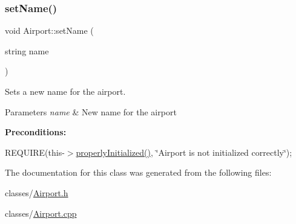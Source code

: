\subsubsection{\texorpdfstring{set\+Name()}{setName()}}
{\footnotesize\ttfamily void Airport\+::set\+Name (\begin{DoxyParamCaption}\item[{string}]{name }\end{DoxyParamCaption})}



Sets a new name for the airport. 


\begin{DoxyParams}{Parameters}
{\em name} & New name for the airport\\
\hline
\end{DoxyParams}
{\bfseries Preconditions\+:}
\begin{DoxyItemize}
\item R\+E\+Q\+U\+I\+RE(this-\/$>$\mbox{\hyperlink{class_airport_aa13e68ac58e8875837fbe888325cfff6}{properly\+Initialized()}}, \char`\"{}\+Airport is not initialized correctly\char`\"{}); 
\end{DoxyItemize}

The documentation for this class was generated from the following files\+:\begin{DoxyCompactItemize}
\item 
classes/\mbox{\hyperlink{_airport_8h}{Airport.\+h}}\item 
classes/\mbox{\hyperlink{_airport_8cpp}{Airport.\+cpp}}\end{DoxyCompactItemize}
